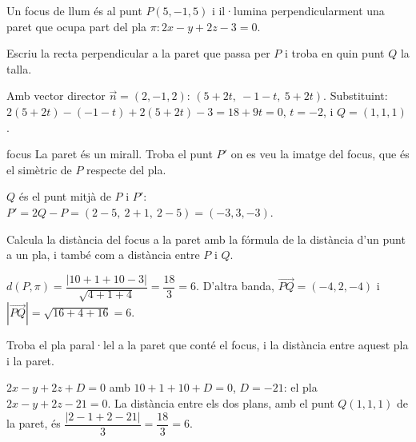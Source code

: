 Un focus de llum és al punt $P(5,-1,5)$ i il·lumina perpendicularment una paret que ocupa part del pla
$\pi\colon 2x-y+2z-3=0$.

\begin{apartats}

Escriu la recta perpendicular a la paret que passa per $P$ i troba en quin punt $Q$ la talla.

\begin{solucio}
Amb vector director $\vec n=(2,-1,2)$: $(5+2t,\ -1-t,\ 5+2t)$. Substituint:
$2(5+2t)-(-1-t)+2(5+2t)-3=18+9t=0$, $t=-2$, i $Q=(1,1,1)$.
\end{solucio}

\begin{tria}{focus}
La paret és un mirall. Troba el punt $P'$ on es veu la imatge del focus, que és el simètric de $P$
respecte del pla.

\begin{solucio}
$Q$ és el punt mitjà de $P$ i $P'$: $P'=2Q-P=(2-5,\ 2+1,\ 2-5)=(-3,3,-3)$.
\end{solucio}

Calcula la distància del focus a la paret amb la fórmula de la distància d'un punt a un pla, i també
com a distància entre $P$ i $Q$.

\begin{solucio}
$d(P,\pi)=\dfrac{|10+1+10-3|}{\sqrt{4+1+4}}=\dfrac{18}3=6$. D'altra banda,
$\overrightarrow{PQ}=(-4,2,-4)$ i $|\overrightarrow{PQ}|=\sqrt{16+4+16}=6$.
\end{solucio}
\end{tria}

\begin{nomesllarg}
Troba el pla paral·lel a la paret que conté el focus, i la distància entre aquest pla i la paret.

\begin{solucio}
$2x-y+2z+D=0$ amb $10+1+10+D=0$, $D=-21$: el pla $2x-y+2z-21=0$. La distància entre els dos plans, amb el
punt $Q(1,1,1)$ de la paret, és $\dfrac{|2-1+2-21|}{3}=\dfrac{18}{3}=6$.
\end{solucio}
\end{nomesllarg}

\end{apartats}
